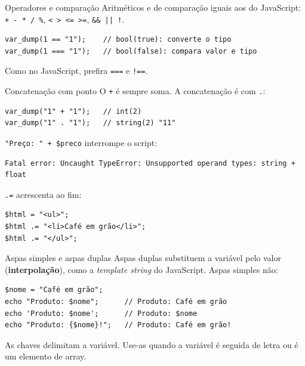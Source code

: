 \documentclass{beamer}
\begin{document}
\begin{frame}[fragile]{Operadores e comparação}
	Aritméticos e de comparação iguais aos do JavaScript: \texttt{+ - * / \%},
	\texttt{< > <= >=}, \texttt{\&\& || !}.

	\begin{verbatim}
var_dump(1 == "1");    // bool(true): converte o tipo
var_dump(1 === "1");   // bool(false): compara valor e tipo
	\end{verbatim}

	\vspace{0.2cm}
	Como no JavaScript, prefira \texttt{===} e \texttt{!==}.
\end{frame}

\begin{frame}[fragile]{Concatenação com ponto}
	O \texttt{+} é sempre soma. A concatenação é com \texttt{.}:

	\begin{verbatim}
var_dump("1" + "1");   // int(2)
var_dump("1" . "1");   // string(2) "11"
	\end{verbatim}

	\texttt{"Preço: " + \$preco} interrompe o script:

	\begin{verbatim}
Fatal error: Uncaught TypeError: Unsupported operand types: string + float
	\end{verbatim}

	\texttt{.=} acrescenta ao fim:

	\begin{verbatim}
$html = "<ul>";
$html .= "<li>Café em grão</li>";
$html .= "</ul>";
	\end{verbatim}
\end{frame}

\begin{frame}[fragile]{Aspas simples e aspas duplas}
	Aspas duplas substituem a variável pelo valor (\textbf{interpolação}), como a
	\emph{template string} do JavaScript. Aspas simples não:

	\begin{verbatim}
$nome = "Café em grão";
echo "Produto: $nome";      // Produto: Café em grão
echo 'Produto: $nome';      // Produto: $nome
echo "Produto: {$nome}!";   // Produto: Café em grão!
	\end{verbatim}

	\vspace{0.2cm}
	As chaves delimitam a variável. Use-as quando a variável é seguida de letra
	ou é um elemento de array.
\end{frame}
\end{document}
